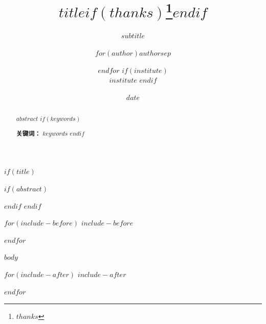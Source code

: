 \documentclass[11pt,a4paper]{ctexart}
\title{$title$$if(thanks)$\thanks{$thanks$}$endif$}
\subtitle{$subtitle$}
\author{$for(author)$$author$$sep$ \and $endfor$
$if(institute)$
  \\ \normalsize $institute$
$endif$
}
\date{$date$}
\begin{document}
\pagestyle{plain}

$if(title)$
\maketitle
$if(abstract)$
\begin{abstract}
$abstract$
$if(keywords)$

\textbf{关键词：} $keywords$
$endif$
\end{abstract}
$endif$
$endif$

$for(include-before)$
$include-before$

$endfor$

$body$

$for(include-after)$
$include-after$

$endfor$
\end{document}
